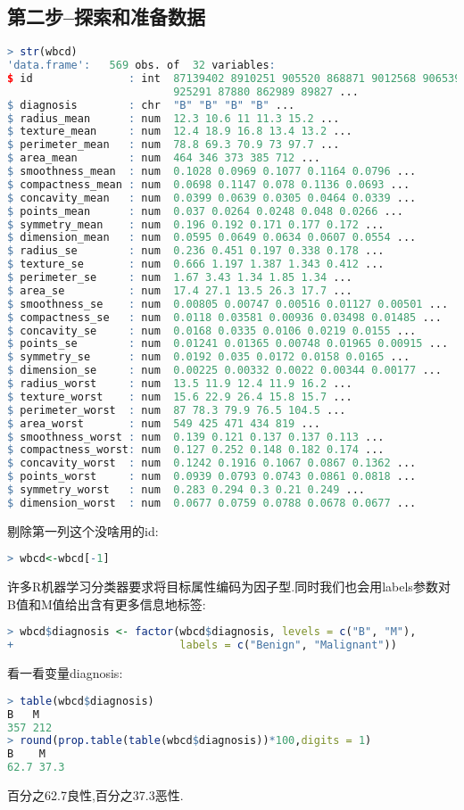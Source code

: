 \documentclass[11pt,a4paper,oneside]{book}
\begin{document}
\subsection{第二步--探索和准备数据}
\begin{lstlisting}[language=r]
> str(wbcd)
'data.frame':	569 obs. of  32 variables:
$ id               : int  87139402 8910251 905520 868871 9012568 906539 
                          925291 87880 862989 89827 ...
$ diagnosis        : chr  "B" "B" "B" "B" ...
$ radius_mean      : num  12.3 10.6 11 11.3 15.2 ...
$ texture_mean     : num  12.4 18.9 16.8 13.4 13.2 ...
$ perimeter_mean   : num  78.8 69.3 70.9 73 97.7 ...
$ area_mean        : num  464 346 373 385 712 ...
$ smoothness_mean  : num  0.1028 0.0969 0.1077 0.1164 0.0796 ...
$ compactness_mean : num  0.0698 0.1147 0.078 0.1136 0.0693 ...
$ concavity_mean   : num  0.0399 0.0639 0.0305 0.0464 0.0339 ...
$ points_mean      : num  0.037 0.0264 0.0248 0.048 0.0266 ...
$ symmetry_mean    : num  0.196 0.192 0.171 0.177 0.172 ...
$ dimension_mean   : num  0.0595 0.0649 0.0634 0.0607 0.0554 ...
$ radius_se        : num  0.236 0.451 0.197 0.338 0.178 ...
$ texture_se       : num  0.666 1.197 1.387 1.343 0.412 ...
$ perimeter_se     : num  1.67 3.43 1.34 1.85 1.34 ...
$ area_se          : num  17.4 27.1 13.5 26.3 17.7 ...
$ smoothness_se    : num  0.00805 0.00747 0.00516 0.01127 0.00501 ...
$ compactness_se   : num  0.0118 0.03581 0.00936 0.03498 0.01485 ...
$ concavity_se     : num  0.0168 0.0335 0.0106 0.0219 0.0155 ...
$ points_se        : num  0.01241 0.01365 0.00748 0.01965 0.00915 ...
$ symmetry_se      : num  0.0192 0.035 0.0172 0.0158 0.0165 ...
$ dimension_se     : num  0.00225 0.00332 0.0022 0.00344 0.00177 ...
$ radius_worst     : num  13.5 11.9 12.4 11.9 16.2 ...
$ texture_worst    : num  15.6 22.9 26.4 15.8 15.7 ...
$ perimeter_worst  : num  87 78.3 79.9 76.5 104.5 ...
$ area_worst       : num  549 425 471 434 819 ...
$ smoothness_worst : num  0.139 0.121 0.137 0.137 0.113 ...
$ compactness_worst: num  0.127 0.252 0.148 0.182 0.174 ...
$ concavity_worst  : num  0.1242 0.1916 0.1067 0.0867 0.1362 ...
$ points_worst     : num  0.0939 0.0793 0.0743 0.0861 0.0818 ...
$ symmetry_worst   : num  0.283 0.294 0.3 0.21 0.249 ...
$ dimension_worst  : num  0.0677 0.0759 0.0788 0.0678 0.0677 ...
\end{lstlisting}
剔除第一列这个没啥用的id:
\begin{lstlisting}[language=r]
> wbcd<-wbcd[-1]
\end{lstlisting}
许多R机器学习分类器要求将目标属性编码为因子型.同时我们也会用labels参数对B值和M值给出含有更多信息地标签:
\begin{lstlisting}[language=r]
> wbcd$diagnosis <- factor(wbcd$diagnosis, levels = c("B", "M"),
+                          labels = c("Benign", "Malignant"))
\end{lstlisting}
看一看变量diagnosis:
\begin{lstlisting}[language=r]
> table(wbcd$diagnosis)
B   M 
357 212 
> round(prop.table(table(wbcd$diagnosis))*100,digits = 1)
B    M 
62.7 37.3 
\end{lstlisting}
百分之62.7良性,百分之37.3恶性.
\end{document}
